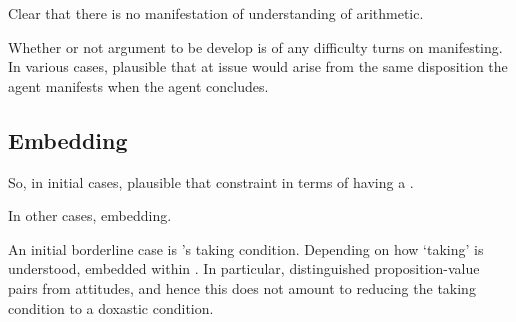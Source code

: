 \begin{note}[Illustration]
  Clear that there is no manifestation of understanding of arithmetic.
\end{note}

\begin{note}
  Whether or not argument to be develop is of any difficulty turns on manifesting.
  In various cases, plausible that  at issue would arise from the same disposition the agent manifests when the agent concludes.
\end{note}

\subsection{Embedding}
\label{cha:var:sec:embedding}

\begin{note}
  So, in initial cases, plausible that constraint in terms of having a \wit{}.

  In other cases, embedding.
\end{note}

\begin{note}
  An initial borderline case is \citeauthor{Boghossian:2014aa}'s taking condition.
  Depending on how `taking' is understood, embedded within \ros{}.
  In particular, distinguished proposition-value pairs from attitudes, and hence this does not amount to reducing the taking condition to a doxastic condition.
\end{note}


\subsubsection{\textcite{Thomson:1965vv}}

